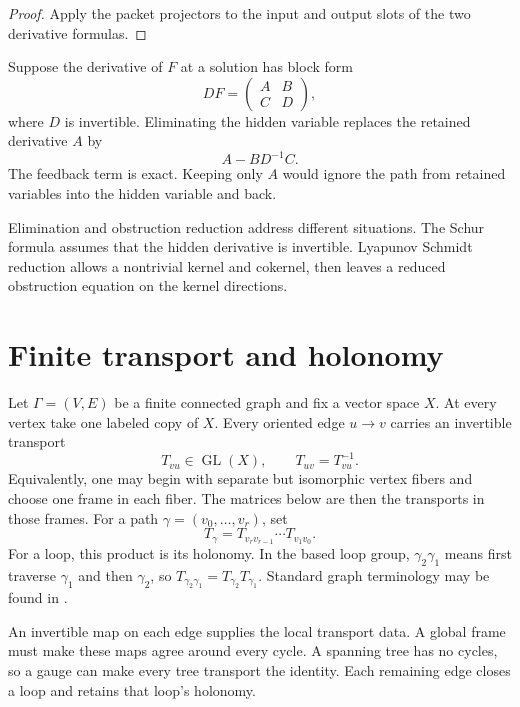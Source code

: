 \begin{proof}
Apply the packet projectors to the input and output slots of the two derivative formulas.
\end{proof}


\begin{example}\label{ex:finite_schur}
Suppose the derivative of $F$ at a solution has block form
\[
DF=
\begin{pmatrix}
A&B\\
C&D
\end{pmatrix},
\]
where $D$ is invertible.  Eliminating the hidden variable replaces the retained derivative $A$ by
\[
A-BD^{-1}C.
\]
The feedback term is exact.  Keeping only $A$ would ignore the path from retained variables into the hidden variable and back.
\end{example}

\begin{remark}\label{rem:elimination_vs_obstruction}
Elimination and obstruction reduction address different situations.  The Schur formula assumes that the hidden derivative is invertible.  Lyapunov Schmidt reduction allows a nontrivial kernel and cokernel, then leaves a reduced obstruction equation on the kernel directions.
\end{remark}

\section{Finite transport and holonomy}\label{sec:finite_holonomy}

Let $\Gamma=(V,E)$ be a finite connected graph and fix a vector space $X$.  At every vertex take one labeled copy of $X$.  Every oriented edge $u\to v$ carries an invertible transport
\[
T_{vu}\in\operatorname{GL}(X),
\qquad
T_{uv}=T_{vu}^{-1}.
\]
Equivalently, one may begin with separate but isomorphic vertex fibers and choose one frame in each fiber.  The matrices below are then the transports in those frames.  For a path $\gamma=(v_0,\ldots,v_r)$, set
\[
T_\gamma
=
T_{v_rv_{r-1}}\cdots T_{v_1v_0}.
\]
For a loop, this product is its holonomy. In the based loop group, $\gamma_2\gamma_1$ means first traverse $\gamma_1$ and then $\gamma_2$, so $T_{\gamma_2\gamma_1}=T_{\gamma_2}T_{\gamma_1}$.  Standard graph terminology may be found in \cite{GrossTucker1987}.

An invertible map on each edge supplies the local transport data. A global frame must make these maps agree around every cycle. A spanning tree has no cycles, so a gauge can make every tree transport the identity. Each remaining edge closes a loop and retains that loop's holonomy.


